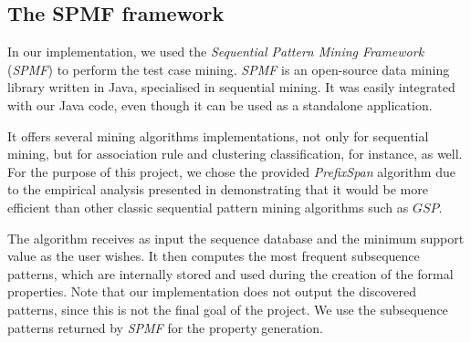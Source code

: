 \subsection{The SPMF framework}
\label{sec-spmf}

In our implementation, we used the \textit{Sequential Pattern Mining Framework} (\textit{SPMF})\cite{spmf} to perform the test case mining. \textit{SPMF} is an open-source data mining library written in Java, specialised in sequential mining. It was easily integrated with our Java code, even though it can be used as a standalone application.

It offers several mining algorithms implementations, not only for sequential mining, but for association rule and clustering classification, for instance, as well. For the purpose of this project, we chose the provided \textit{PrefixSpan} algorithm due to the empirical analysis presented in \cite{Pei} demonstrating that it would be more efficient than other classic sequential pattern mining algorithms such as $GSP$.

The algorithm receives as input the sequence database and the minimum support value as the user wishes. It then computes the most frequent subsequence patterns, which are internally stored and used during the creation of the formal properties. Note that our implementation does not output the discovered patterns, since this is not the final goal of the project. We use the subsequence patterns returned by \textit{SPMF} for the property generation. 



